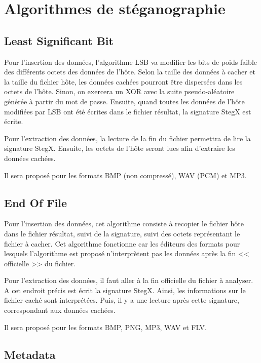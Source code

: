 \documentclass[11pt]{article}
\begin{document}
\section{Algorithmes de stéganographie}

\subsection{Least Significant Bit}

Pour l'insertion des données, l'algorithme LSB va modifier les bits de 
poids faible des différents octets des données de l'hôte. Selon la taille des
données à cacher et la taille du fichier hôte, les données cachées pourront 
être dispersées dans les octets de l'hôte. Sinon, on exercera un XOR avec 
la suite pseudo-aléatoire générée à partir du mot de passe. 
Ensuite, quand toutes les données de l'hôte modifiées par LSB ont été écrites 
dans le fichier résultat, la signature StegX est écrite. 

Pour l'extraction des données, la lecture de la fin du fichier permettra de 
lire la signature StegX. Ensuite, les octets de l'hôte seront lues afin d'extraire 
les données cachées. 

Il sera proposé pour les formats BMP (non compressé), WAV (PCM) et MP3.

\subsection{End Of File}

Pour l'insertion des données, cet algorithme consiste à recopier le fichier 
hôte dans le fichier résultat, suivi de la signature, suivi des octets 
représentant le fichier à cacher. Cet algorithme fonctionne car les éditeurs 
des formats pour lesquels l'algorithme est proposé n'interprètent pas les données 
après la fin << officielle >> du fichier. 

Pour l'extraction des données, il faut aller à la fin officielle du fichier 
à analyser. A cet endroit précis est écrit la signature StegX. Ainsi, 
les informations sur le fichier caché sont interprétées. Puis, il y a une 
lecture après cette signature, correspondant aux données cachées. 

Il sera proposé pour les formats BMP, PNG, MP3, WAV et FLV.

\subsection{Metadata}
\end{document}
